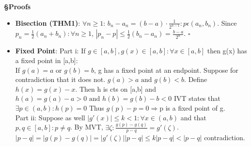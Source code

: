 \documentclass{article}
\begin{document}
\begin{tcolorbox}[colframe=black,colback=white,boxrule=0.3pt,arc=1pt,
left=0pt,right=0pt,top=0pt,bottom=0pt]
\begin{minipage}[t]{0.49\textwidth}
\textbf{\S Proofs}
\begin{itemize}
    \item \textbf{Bisection (THM1)}: $\forall n\ge1$: $b_n-a_n=(b-a)\cdot\frac{1}{2^{n-1}} :p\epsilon (a_n, b_n)$. Since $p_n = \frac{1}{2}(a_n+b_n): \forall n \ge 1$, $|p_n-p|\le \frac{1}{2}(b_n-a_n)=\frac{b-a}{2^n}$. $\square$
    \item \textbf{Fixed Point}: Part i: If $g\in[a,b],g(x)\in[a,b]:\forall x\in[a,b]$ then g(x) has a fixed point in [a,b]:\\
    If $g(a)=a\text{ or } g(b)=b$, g has a fixed point at an endpoint. Suppose for contradiction that it does not. $g(a)>a \text{ and }g(b)<b$. Define $h(x)=g(x)-x$. Then h is cts on [a,b] and $h(a)=g(a)-a>0 \text{ and } h(b)=g(b)-b<0$ IVT states that $\exists p \in(a,b): h(p)=0$ Thus $g(p)-p=0 \Rightarrow$p is a fixed point of g.\\
    Part ii: Suppose as well $|g'(x)|\le k< 1:\forall x \in(a,b)$ and that $p,q\in[a,b]:p\ne q$. By MVT, $\exists \zeta: \frac{g(p)-g(q)}{p-q}=g'(\zeta)$. $|p-q|=|g(p)-g(q)|=|g'(\zeta)||p-q|\le k|p-q| < |p-q|$ contradiction.
\end{itemize}
\end{minipage}
\end{tcolorbox}
\newpage
\end{document}
